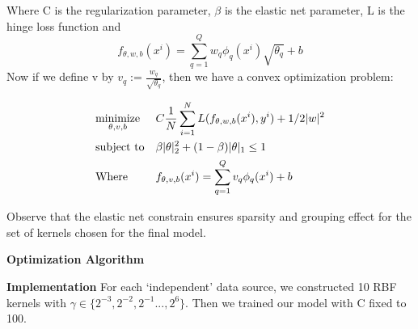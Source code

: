 \documentclass{article}
\begin{document}
Where C is the regularization parameter, $\beta$ is the elastic net parameter, L is the hinge loss function and $$f_{\theta, w, b}(x^i) = \sum_{q=1}^{Q} w_q \phi_q(x^i) \sqrt{\theta_q} + b $$
Now if we define v by $v_q := \frac{w_q}{\sqrt{\theta_q}}$, then we have a convex optimization problem:

\begin{align*}
&\text{$\underset{\theta, v, b}{\text{minimize}}$} & &C  \frac{1}{N} \sum_{i=1}^{N} L(f_{\theta, w, b}(x^i), y^i) + 1/2 |w|^2 \\
&\text{subject to} & &\beta|\theta|_2^2 + (1-\beta){|\theta|_1} \leq 1 \\
&\text{Where}  & &f_{\theta, v, b}(x^i) = \sum_{q=1}^{Q} v_q \phi_q(x^i)  + b
\end{align*}

Observe that the elastic net constrain ensures sparsity and grouping effect for the set of kernels chosen for the final model.

\textbf{Optimization Algorithm}

\vspace{10 mm}
\textbf{Implementation}
For each `independent' data source, we constructed 10 RBF kernels with $\gamma \in \{2^{-3}, 2^{-2}, 2^{-1} ..., 2^{6}\}$. Then we trained our model with C fixed to 100.
\end{document}
